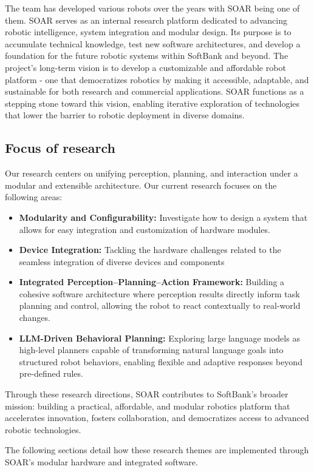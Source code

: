 \documentclass[runningheads,a4paper]{llncs}
\begin{document}
The team has developed various robots over the years with SOAR being one of them.
SOAR serves as an internal research platform dedicated to advancing robotic intelligence, system integration and modular design.
Its purpose is to accumulate technical knowledge, test new software architectures, and develop a foundation for the future robotic systems within SoftBank and beyond.
The project's long-term vision is to develop a customizable and affordable robot platform - one that democratizes robotics by making it accessible, adaptable, and sustainable for both research and commercial applications.
SOAR functions as a stepping stone toward this vision, enabling iterative exploration of technologies that lower the barrier to robotic deployment in diverse domains.

\subsection{Focus of research}
Our research centers on unifying perception, planning, and interaction under a modular and extensible architecture.
Our current research focuses on the following areas:
\begin{itemize}
	\item \textbf{Modularity and Configurability:} Investigate how to design a system that allows for easy integration and customization of hardware modules.
	\item \textbf{Device Integration:} Tackling the hardware challenges related to the seamless integration of diverse devices and components
	\item \textbf{Integrated Perception–Planning–Action Framework:} Building a cohesive software architecture where perception results directly inform task planning and control, allowing the robot to react contextually to real-world changes.
	\item \textbf{LLM-Driven Behavioral Planning:} Exploring large language models as high-level planners capable of transforming natural language goals into structured robot behaviors, enabling flexible and adaptive responses beyond pre-defined rules.
\end{itemize}
Through these research directions, SOAR contributes to SoftBank’s broader mission: building a practical, affordable, and modular robotics platform that accelerates innovation, fosters collaboration, and democratizes access to advanced robotic technologies.

The following sections detail how these research themes are implemented through SOAR’s modular hardware and integrated software.
\end{document}

